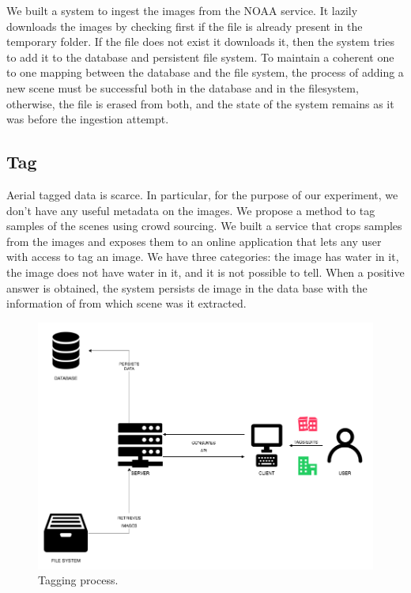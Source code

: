 We built a system to ingest the images from the NOAA service. It lazily downloads the images by checking first if the file is already present in the temporary folder. If the file does not exist it downloads it, then the system tries to add it to the database and persistent file system. To maintain a coherent one to one mapping between the database and the file system, the process of adding a new scene must be successful both in the database and in the filesystem, otherwise, the file is erased from both, and the state of the system remains as it was before the ingestion attempt.\\

\subsection{Tag}


Aerial tagged data is scarce. In particular, for the purpose of our experiment, we don't have any useful metadata on the images. We propose a method to tag samples of the scenes using crowd sourcing. We built a service that crops samples from the images and exposes them to an online application that lets any user with access to tag an image. We have three categories: the image has water in it, the image does not have water in it, and it is not possible to tell. When a positive answer is obtained, the system persists de image in the data base with the information of from which scene was it extracted.\\



\begin{figure}[h]
  \centering
  \includegraphics[width=1\textwidth]{images/tag-diagram.png}
  \caption{Tagging process.}
  \label{fig:tag}
\end{figure}

